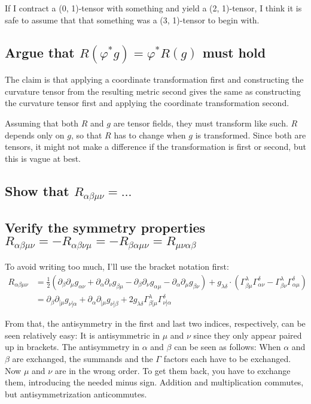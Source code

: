 If I contract a (0, 1)-tensor with something and yield a (2, 1)-tensor, I think
it is safe to assume that that something was a (3, 1)-tensor to begin with.

\subsection{Argue that $R(\varphi^*g) = \varphi^* R(g)$ must hold}

The claim is that applying a coordinate transformation first and
constructing the curvature tensor from the resulting metric second gives the
same as constructing the curvature tensor first and applying the coordinate
transformation second.

Assuming that both $R$ and $g$ are tensor fields, they must transform like
such. $R$ depends only on $g$, so that $R$ has to change when $g$ is
transformed. Since both are tensors, it might not make a difference if the
transformation is first or second, but this is vague at best.

\subsection{Show that $R_{\alpha\beta\mu\nu} = \ldots$}

\subsection{Verify the symmetry properties $R_{\alpha\beta\mu\nu} = -
R_{\alpha\beta\nu\mu} = - R_{\beta\alpha\mu\nu} = R_{\mu\nu\alpha\beta}$}

To avoid writing too much, I'll use the bracket notation first:
\begin{align*}
    R_{\alpha\beta\mu\nu}
    &= \frac 12 (\partial_\beta \partial_\mu g_{\alpha\nu} + \partial_\alpha
    \partial_\nu g_{\beta\mu} - \partial_\beta \partial_\nu g_{\alpha\mu} -
    \partial_\alpha \partial_\mu g_{\beta\nu})
    + g_{\lambda\delta} \cdot (
    \Gamma^\lambda_{\beta\mu} \Gamma^\delta_{\alpha\nu}
    - \Gamma^\lambda_{\beta\nu} \Gamma^\delta_{\alpha\mu}
    ) \\
    &= \partial_\beta \partial_{[\mu} g_{\nu]\alpha}
    + \partial_\alpha \partial_{[\mu} g_{\nu]\beta}
    + 2 g_{\lambda\delta} \Gamma^\lambda_{\beta[\mu} \Gamma^\delta_{\nu]\alpha}
\end{align*}

From that, the antisymmetry in the first and last two indices, respectively,
can be seen relatively easy: It is antisymmetric in $\mu$ and $\nu$ since they
only appear paired up in brackets. The antisymmetry in $\alpha$ and $\beta$ can
be seen as follows: When $\alpha$ and $\beta$ are exchanged, the summands and
the $\Gamma$ factors each have to be exchanged. Now $\mu$ and $\nu$ are in the
wrong order. To get them back, you have to exchange them, introducing the
needed minus sign. Addition and multiplication commutes, but antisymmetrization
anticommutes.

